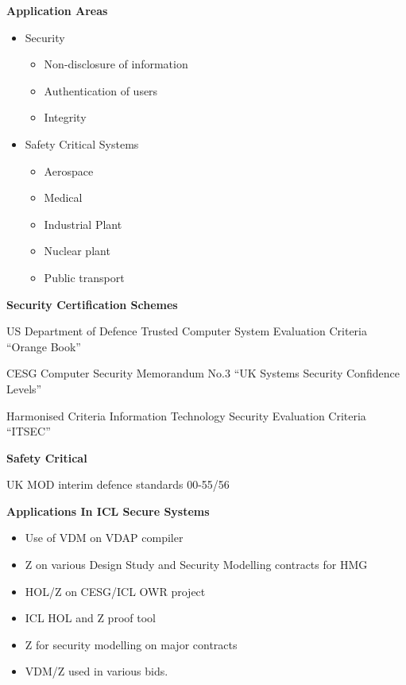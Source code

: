\begin{slide}{}

\begin{center}
{\bf Application Areas}
\end{center}


\begin{itemize}
\item
Security

\begin{itemize}
\item
Non-disclosure of information
\item
Authentication of users
\item
Integrity
\end{itemize}

\item
Safety Critical Systems

\begin{itemize}
\item
Aerospace
\item
Medical
\item
Industrial Plant
\item
Nuclear plant
\item
Public transport
\end{itemize}

\end{itemize}
\end{slide}


\begin{slide}{}
\begin{center}
{\bf Security Certification Schemes}


US Department of Defence
Trusted Computer System
Evaluation Criteria
``Orange Book''

CESG Computer Security Memorandum No.3
``UK Systems Security Confidence Levels''

Harmonised Criteria
Information Technology Security
Evaluation Criteria
``ITSEC''

{\bf Safety Critical}

UK MOD
interim defence standards 00-55/56
\end{center}
\end{slide}

\begin{slide}{}

\begin{center}
{\bf {Applications In ICL Secure Systems}}
\end{center}

\begin{itemize}
\item
Use of VDM on VDAP compiler
\item
Z on various Design Study and Security Modelling contracts for HMG
\item
HOL/Z on CESG/ICL OWR project
\item
ICL HOL and Z proof tool
\item
Z for security modelling on major contracts
\item
VDM/Z used in various bids. 
\end{itemize}

\end{slide}

